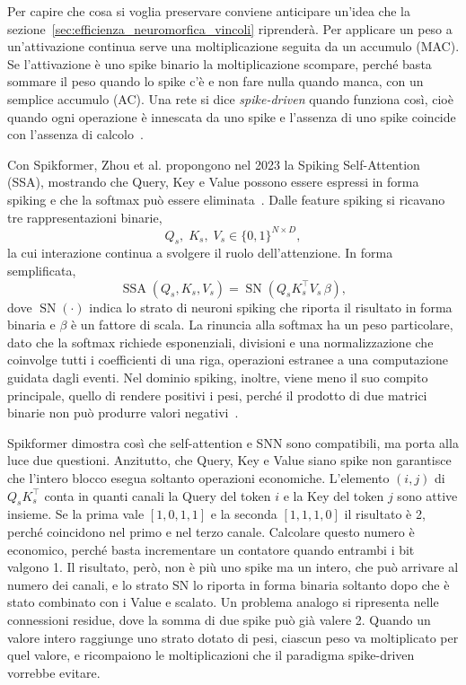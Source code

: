 Per capire che cosa si voglia preservare conviene anticipare un'idea che la sezione~\ref{sec:efficienza_neuromorfica_vincoli} riprenderà. Per applicare un peso a un'attivazione continua serve una moltiplicazione seguita da un accumulo (MAC). Se l'attivazione è uno spike binario la moltiplicazione scompare, perché basta sommare il peso quando lo spike c'è e non fare nulla quando manca, con un semplice accumulo (AC). Una rete si dice \emph{spike-driven} quando funziona così, cioè quando ogni operazione è innescata da uno spike e l'assenza di uno spike coincide con l'assenza di calcolo~\cite{yao2023spikedriven}.

Con Spikformer, Zhou et al. propongono nel 2023 la Spiking Self-Attention (SSA), mostrando che Query, Key e Value possono essere espressi in forma spiking e che la softmax può essere eliminata~\cite{zhou2023spikformer}. Dalle feature spiking si ricavano tre rappresentazioni binarie,
\begin{equation}
\label{eq:spiking_qkv}
Q_s, \; K_s, \; V_s \in \{0, 1\}^{N \times D},
\end{equation}
la cui interazione continua a svolgere il ruolo dell'attenzione. In forma semplificata,
\begin{equation}
\label{eq:ssa_spikformer}
\operatorname{SSA}(Q_s, K_s, V_s) = \operatorname{SN}\left( Q_s K_s^{\top} V_s \, \beta \right),
\end{equation}
dove $\operatorname{SN}(\cdot)$ indica lo strato di neuroni spiking che riporta il risultato in forma binaria e $\beta$ è un fattore di scala. La rinuncia alla softmax ha un peso particolare, dato che la softmax richiede esponenziali, divisioni e una normalizzazione che coinvolge tutti i coefficienti di una riga, operazioni estranee a una computazione guidata dagli eventi. Nel dominio spiking, inoltre, viene meno il suo compito principale, quello di rendere positivi i pesi, perché il prodotto di due matrici binarie non può produrre valori negativi~\cite{zhou2023spikformer}.

Spikformer dimostra così che self-attention e SNN sono compatibili, ma porta alla luce due questioni. Anzitutto, che Query, Key e Value siano spike non garantisce che l'intero blocco esegua soltanto operazioni economiche. L'elemento $(i,j)$ di $Q_sK_s^{\top}$ conta in quanti canali la Query del token $i$ e la Key del token $j$ sono attive insieme. Se la prima vale $[1,0,1,1]$ e la seconda $[1,1,1,0]$ il risultato è 2, perché coincidono nel primo e nel terzo canale. Calcolare questo numero è economico, perché basta incrementare un contatore quando entrambi i bit valgono 1. Il risultato, però, non è più uno spike ma un intero, che può arrivare al numero dei canali, e lo strato SN lo riporta in forma binaria soltanto dopo che è stato combinato con i Value e scalato. Un problema analogo si ripresenta nelle connessioni residue, dove la somma di due spike può già valere 2. Quando un valore intero raggiunge uno strato dotato di pesi, ciascun peso va moltiplicato per quel valore, e ricompaiono le moltiplicazioni che il paradigma spike-driven vorrebbe evitare.

